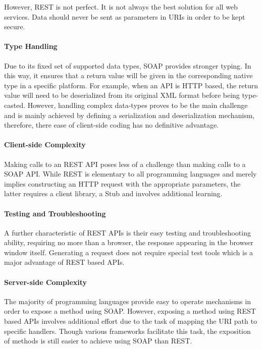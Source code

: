 However, \ac{REST} is not perfect. It is not always the best solution for all web services. Data should never be sent as parameters in \ac{URI}s in order to be kept secure. 

\paragraph{Type Handling}

Due to its fixed set of supported data types, \ac{SOAP} provides stronger typing. In this way, it ensures that a return value  will be given in the corresponding native type in a specific platform. For example, when an \ac{API} is \ac{HTTP} based, the return value will need to be deserialized from its original \ac{XML} format before being type-casted.    
However, handling complex data-types proves to be the main challenge and is mainly achieved by defining a serialization and deserialization mechanism, therefore, there ease of client-side coding has no definitive advantage. 


\paragraph{Client-side Complexity}

Making calls to an \ac{REST} \ac{API} poses less of a challenge than making calls to a \ac{SOAP} \ac{API}. While \ac{REST} is elementary to all programming languages and merely implies constructing an \ac{HTTP} request with the appropriate parameters, the latter requires a client library, a Stub and involves additional learning.  

\paragraph{Testing and Troubleshooting}

A further characteristic of \ac{REST} \ac{API}s is their easy testing and troubleshooting ability, requiring no more than a browser, the response appearing in the browser window itself. Generating a request does not require special test tools which is a major advantage of \ac{REST} based \ac{API}s.  
  

\paragraph{Server-side Complexity}

The majority of programming languages provide easy to operate mechanisms in order to expose a method using \ac{SOAP}. However, exposing a method using \ac{REST} based \ac{API}s involves additional effort due to the task of mapping the \ac{URI} path to specific handlers. Though various frameworks facilitate this task, the exposition of methods is still easier to achieve using \ac{SOAP} than \ac{REST}.

